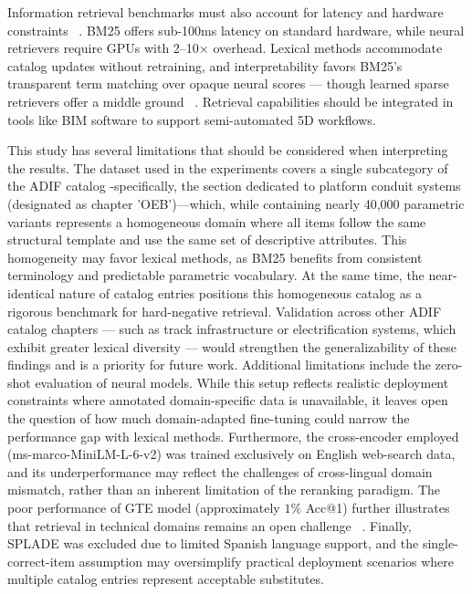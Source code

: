 \documentclass[preprint,12pt]{elsarticle}
\begin{document}
Information retrieval benchmarks must also account for latency and hardware constraints ~\cite{santhanam-etal-2023-moving}. BM25 offers sub-100ms latency on standard hardware, while neural retrievers require GPUs with 2–10× overhead. Lexical methods accommodate catalog updates without retraining, and interpretability favors BM25's transparent term matching over opaque neural scores --- though learned sparse retrievers offer a middle ground ~\cite{bruch2023analysis}. Retrieval capabilities should  be integrated in tools like BIM software to support semi-automated 5D workflows.

This study has several limitations that should be considered when interpreting the results. The dataset used in the experiments covers a single subcategory of the ADIF catalog -specifically, the section dedicated to platform conduit systems (designated as chapter 'OEB')—which, while containing nearly 40,000 parametric variants represents a homogeneous domain where all items follow the same structural template and use the same set of descriptive attributes. This homogeneity may favor lexical methods, as BM25 benefits from consistent terminology and predictable parametric vocabulary. At the same time, the near-identical nature of catalog entries positions this homogeneous catalog as a rigorous benchmark for hard-negative retrieval. Validation across other ADIF catalog chapters — such as track infrastructure or electrification systems, which exhibit greater lexical diversity — would strengthen the generalizability of these findings and is a priority for future work.
Additional limitations include the zero-shot evaluation of neural models. While this setup reflects realistic deployment constraints where annotated domain-specific data is unavailable, it leaves open the question of how much domain-adapted fine-tuning could narrow the performance gap with lexical methods. Furthermore, the cross-encoder employed (ms-marco-MiniLM-L-6-v2) was trained exclusively on English web-search data, and its underperformance may reflect the challenges of cross-lingual domain mismatch, rather than an inherent limitation of the reranking paradigm. The poor performance of GTE model (approximately $1\%$ Acc@1) further illustrates that retrieval in technical domains remains an open challenge ~\cite{jungyeon2024cross-lingual}. Finally, SPLADE was excluded due to limited Spanish language support, and the single-correct-item assumption may oversimplify practical deployment scenarios where multiple catalog entries represent acceptable substitutes.
\end{document}
